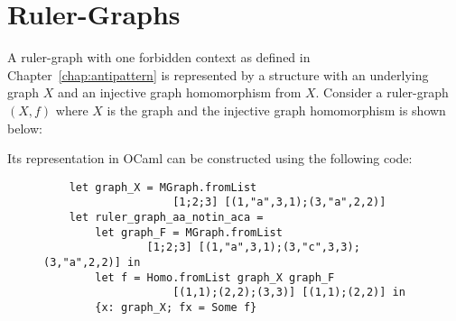 \section{Ruler-Graphs}
A ruler-graph with one forbidden context as defined in Chapter~\ref{chap:antipattern} is represented by a structure with an underlying graph $X$ and an injective graph homomorphism from $X$. 
Consider a ruler-graph $(X, f)$ where $X$ is the graph  
and the injective graph homomorphism is shown below:
\begin{center}
\end{center}
Its representation in OCaml
        can be constructed using the following code:
\begin{figure}[H]
\begin{verbatim} 
    let graph_X = MGraph.fromList 
                    [1;2;3] [(1,"a",3,1);(3,"a",2,2)]
    let ruler_graph_aa_notin_aca = 
        let graph_F = MGraph.fromList 
                [1;2;3] [(1,"a",3,1);(3,"c",3,3);(3,"a",2,2)] in
        let f = Homo.fromList graph_X graph_F 
                    [(1,1);(2,2);(3,3)] [(1,1);(2,2)] in
        {x: graph_X; fx = Some f}
\end{verbatim}
    \caption{}
    \label{fig:implemented:ruler_graph_representation}
\end{figure}

